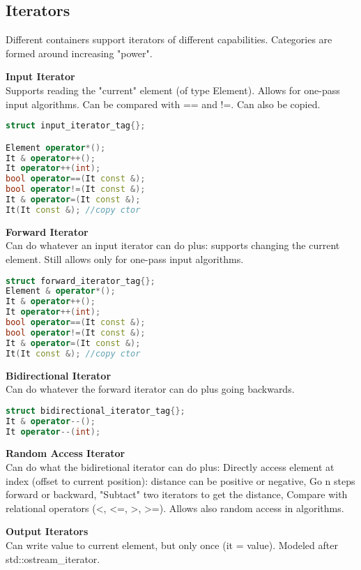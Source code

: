 \subsection{Iterators}
Different containers support iterators of different capabilities. Categories are formed around increasing "power".

\textbf{Input Iterator} \\
Supports reading the "current" element (of type Element). Allows for one-pass input algorithms.  Can be compared with == and !=. Can also be copied.

\begin{lstlisting}[language=C++]
struct input_iterator_tag{};

Element operator*();
It & operator++();
It operator++(int);
bool operator==(It const &);
bool operator!=(It const &);
It & operator=(It const &);
It(It const &); //copy ctor
\end{lstlisting}

\textbf{Forward Iterator} \\
Can do whatever an input iterator can do plus: supports changing the current element. Still allows only for one-pass input algorithms.
\begin{lstlisting}[language=C++]
struct forward_iterator_tag{};
Element & operator*();
It & operator++();
It operator++(int);
bool operator==(It const &);
bool operator!=(It const &);
It & operator=(It const &);
It(It const &); //copy ctor
\end{lstlisting}

\textbf{Bidirectional Iterator}\\
Can do whatever the forward iterator can do plus going backwards.
\begin{lstlisting}[language=C++]
struct bidirectional_iterator_tag{};
It & operator--();
It operator--(int);
\end{lstlisting}

\textbf{Random Access Iterator} \\
Can do what the bidiretional iterator can do plus: Directly access element at index (offset to current position): distance can be positive or negative, Go n steps forward or backward, "Subtact" two iterators to get the distance, Compare with relational operators (<, <=, >, >=).
 Allows also random access in algorithms.

\textbf{Output Iterators} \\
 Can write value to current element, but only once (\*it = value).  Modeled after std::ostream\_iterator.

